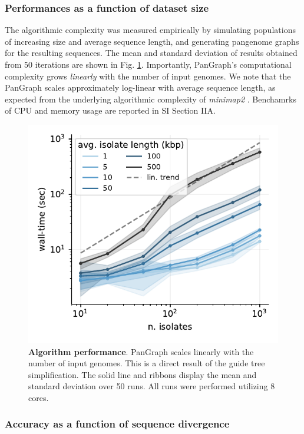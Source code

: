 \documentclass[aps,rmp,reprint,superscriptaddress,notitlepage,10pt]{revtex4-1}
\begin{document}
\subsubsection*{Performances as a function of dataset size}

The algorithmic complexity was measured empirically by simulating populations of increasing size and average sequence length, and generating pangenome graphs for the resulting sequences.
The mean and standard deviation of results obtained from 50 iterations are shown in Fig. \ref{fig:toy-performance}.
Importantly, PanGraph's computational complexity grows \emph{linearly} with the number of input genomes.
We note that the PanGraph scales approximately log-linear with average sequence length, as expected from the underlying algorithmic complexity of \textit{minimap2} \cite{li2018minimap2}.
Benchamrks of CPU and memory usage are reported in SI Section IIA.

\begin{figure}[htb]
    \includegraphics[width=.4\textwidth]{figs/benchmark.pdf}
    \caption{{\bf Algorithm performance}.
        PanGraph scales linearly with the number of input genomes.
        This is a direct result of the guide tree simplification.
        The solid line and ribbons display the mean and standard deviation over 50 runs.
        All runs were performed utilizing 8 cores.
    }
    \label{fig:toy-performance}
\end{figure}

\subsubsection*{Accuracy as a function of sequence divergence}
\end{document}
